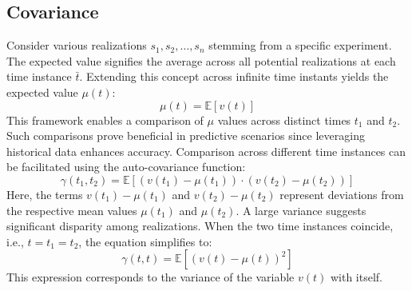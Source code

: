 \subsection{Covariance}
Consider various realizations $s_1, s_2, \dots, s_n$ stemming from a specific experiment. 
The expected value signifies the average across all potential realizations at each time instance $\bar{t}$.
Extending this concept across infinite time instants yields the expected value $\mu(t)$:
\[\mu(t)=\mathbb{E}\left[ v(t) \right]\]
This framework enables a comparison of $\mu$ values across distinct times $t_1$ and $t_2$. 
Such comparisons prove beneficial in predictive scenarios since leveraging historical data enhances accuracy.
Comparison across different time instances can be facilitated using the auto-covariance function:
\[\gamma(t_1,t_2)=\mathbb{E}\left[ \left(v(t_1)-\mu(t_1)\right) \cdot \left(v(t_2)-\mu(t_2)\right) \right]\]
Here, the terms $v(t_1) - \mu(t_1)$ and $v(t_2) - \mu(t_2)$ represent deviations from the respective mean values $\mu(t_1)$ and $\mu(t_2)$.
A large variance suggests significant disparity among realizations.
When the two time instances coincide, i.e., $t = t_1 = t_2$, the equation simplifies to:
\[\gamma(t,t)=\mathbb{E}\left[ \left(v(t)-\mu(t)\right)^2 \right]\]
This expression corresponds to the variance of the variable $v(t)$ with itself. 

